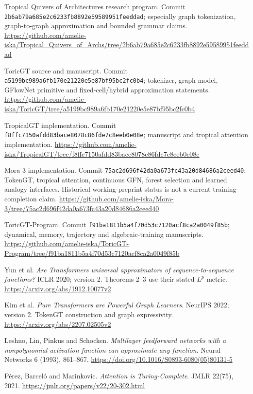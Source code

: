 \begin{description}[style=nextline,leftmargin=1cm]
\item[P1] Tropical Quivers of Architectures research program. Commit \texttt{2b6ab79a685e2c6233fb8892e59589951feeddad}; especially graph tokenization, graph-to-graph approximation and bounded grammar claims. \url{https://github.com/amelie-iska/Tropical_Quivers_of_Archs/tree/2b6ab79a685e2c6233fb8892e59589951feeddad}
\item[P2] ToricGT source and manuscript. Commit \texttt{a5199bc989a6fb170e21220e5e87bf95bc2fc0b4}; tokenizer, graph model, GFlowNet primitive and fixed-cell/hybrid approximation statements. \url{https://github.com/amelie-iska/ToricGT/tree/a5199bc989a6fb170e21220e5e87bf95bc2fc0b4}
\item[P3] TropicalGT implementation. Commit \texttt{f8ffc7150afdd83bace8078c86fde7c8eeb0e08e}; manuscript and tropical attention implementation. \url{https://github.com/amelie-iska/TropicalGT/tree/f8ffc7150afdd83bace8078c86fde7c8eeb0e08e}
\item[P4] Mora-3 implementation. Commit \texttt{75ac2d696f42da0a673fc43a20d84686a2ceed40}; TokenGT, tropical attention, continuous GFN, forest selection and learned analogy interfaces. Historical working-preprint status is not a current training-completion claim. \url{https://github.com/amelie-iska/Mora-3/tree/75ac2d696f42da0a673fc43a20d84686a2ceed40}
\item[P5] ToricGT-Program. Commit \texttt{f91ba1811b5a4f70d53c7120acf8ca2a0049f85b}; dynamical, memory, trajectory and algebraic-training manuscripts. \url{https://github.com/amelie-iska/ToricGT-Program/tree/f91ba1811b5a4f70d53c7120acf8ca2a0049f85b}
\item[R1] Yun et al. \emph{Are Transformers universal approximators of sequence-to-sequence functions?} ICLR 2020; version 2. Theorems 2--3 use their stated $L^p$ metric. \url{https://arxiv.org/abs/1912.10077v2}
\item[R2] Kim et al. \emph{Pure Transformers are Powerful Graph Learners}. NeurIPS 2022; version 2. TokenGT construction and graph expressivity. \url{https://arxiv.org/abs/2207.02505v2}
\item[R3] Leshno, Lin, Pinkus and Schocken. \emph{Multilayer feedforward networks with a nonpolynomial activation function can approximate any function}. Neural Networks 6 (1993), 861--867. \url{https://doi.org/10.1016/S0893-6080(05)80131-5}
\item[R4] P\'erez, Barcel\'o and Marinkovic. \emph{Attention is Turing-Complete}. JMLR 22(75), 2021. \url{https://jmlr.org/papers/v22/20-302.html}

\end{description}
